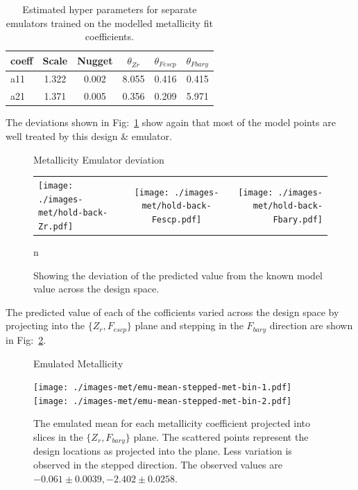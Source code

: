 \documentclass[11pt]{article}
\begin{document}
\begin{table}
  \begin{center}
    \begin{tabular}{l c c c c r}
      coeff & Scale & Nugget & $\theta_{Zr}$ & $\theta_{Fescp}$ & $\theta_{Fbary}$ \\
      \hline
      a11 & 1.322 & 0.002 & 8.055 & 0.416 & 0.415 \\
      a21 & 1.371 & 0.005 & 0.356 & 0.209 & 5.971
    \end{tabular}
    \caption{Estimated hyper parameters for separate emulators trained on
      the modelled metallicity fit coefficients.}
    \label{tab-theta-values-met}
  \end{center}
\end{table}


The deviations shown in Fig:~\ref{fig-deviates-met} show again that
most of the model points are well treated by this design \& emulator.

\begin{figure}
    \begin{center}
      \large{Metallicity Emulator deviation}
    \end{center}
  \begin{tabular}{l c r}
    \texttt{[image: ./images-met/hold-back-Zr.pdf]}  &
    \texttt{[image: ./images-met/hold-back-Fescp.pdf]}  & 
    \texttt{[image: ./images-met/hold-back-Fbary.pdf]}
  \end{tabular}
  n  \caption{Showing the deviation of the predicted value from the known model value across the design space.}
  \label{fig-deviates-met}
\end{figure}

The predicted value of each of the cofficients varied across the
design space by projecting into the $\{Z_r, F_{escp}\}$ plane and
stepping in the $F_{bary}$ direction are shown in
Fig:~\ref{fig-emulator-slices-met}.

\begin{figure}
  \begin{center}
    \large{Emulated Metallicity}
  \end{center}
    \texttt{[image: ./images-met/emu-mean-stepped-met-bin-1.pdf]} 
    \texttt{[image: ./images-met/emu-mean-stepped-met-bin-2.pdf]} \\
  \caption{The emulated mean for each metallicity coefficient projected into
    slices in the $\{Z_r, F_{bary}\}$ plane. The scattered points
    represent the design locations as projected into the plane. Less
    variation is observed in the stepped direction. The observed
    values are $-0.061 \pm 0.0039, -2.402 \pm 0.0258$.}
  \label{fig-emulator-slices-met}
\end{figure}
\end{document}
